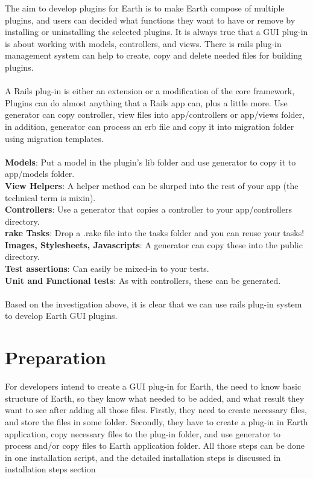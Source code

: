 \documentclass[10pt,oneside]{article}
\begin{document}
The aim to develop plugins for Earth is to make Earth compose of multiple plugins, and users can decided what functions they want to have or remove by installing or uninstalling the selected plugins. It is always true that a GUI plug-in is about working with models, controllers, and views. There is rails plug-in management system can help to create, copy and delete needed files for building plugins.\\
\\
A Rails plug-in is either an extension or a modification of the core framework, Plugins can do almost anything that a Rails app can, plus a little more. Use generator can copy controller, view files into app/controllers or app/views folder, in addition, generator can process an erb file and copy it into migration folder using migration templates.\\
\\
\textbf{Models}: Put a model in the plugin’s lib folder and use generator to copy it to app/models folder.\\
\textbf{View Helpers}: A helper method can be slurped into the rest of your app (the technical term is mixin). \\
\textbf{Controllers}: Use a generator that copies a controller to your app/controllers directory. \\
\textbf{rake Tasks}: Drop a .rake file into the tasks folder and you can reuse your tasks!\\
\textbf{Images, Stylesheets, Javascripts}: A generator can copy these into the public directory. \\
\textbf{Test assertions}: Can easily be mixed-in to your tests.\\
\textbf{Unit and Functional tests}: As with controllers, these can be generated.\\
\\
Based on the investigation above, it is clear that we can use rails plug-in system to develop Earth GUI plugins.\\

\section{Preparation}
 
For developers intend to create a GUI plug-in for Earth, the need to know basic structure of Earth, so they know what needed to be added, and what result they want to see after adding all those files. Firstly, they need to create necessary files, and store the files in some folder. Secondly, they have to create a plug-in in Earth application, copy necessary files to the plug-in folder, and use generator to process and/or copy files to Earth application folder. All those steps can be done in one installation script, and the detailed installation steps is discussed in installation steps section
\end{document}
